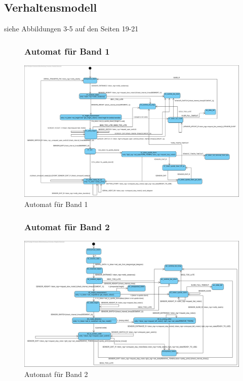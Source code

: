\documentclass[oneside,a4paper,titlepage]{scrartcl}              %
\begin{document}
\subsection{Verhaltensmodell}
siehe Abbildungen 3-5 auf den Seiten 19-21

\begin{figure}[p]
  \subsubsection{Automat für Band 1}
  \centering\includegraphics[angle=90,scale=0.59]{imgs/Band1_FSM.png}
  \caption{Automat für Band 1}
\end{figure}

\begin{figure}[p]
  \subsubsection{Automat für Band 2}
  \centering\includegraphics[angle=90,scale=0.635]{imgs/Band2_FSM.png}
  \caption{Automat für Band 2}
  \clearpage
\end{figure}
\end{document}
